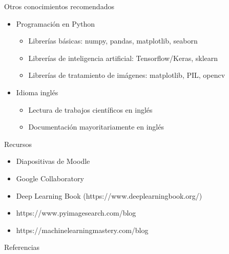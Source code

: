 \begin{frame}{Otros conocimientos recomendados}
\begin{itemize}
    \item \alert{Programación en Python}
    \begin{itemize}
        \item Librerías básicas: numpy, pandas, matplotlib, seaborn
        \item Librerías de inteligencia artificial: Tensorflow/Keras, sklearn
        \item Librerías de tratamiento de imágenes: matplotlib, PIL, opencv
    \end{itemize}
    \item \alert{Idioma inglés}
    \begin{itemize}
        \item Lectura de trabajos científicos en inglés
        \item Documentación mayoritariamente en inglés
    \end{itemize}
\end{itemize}
\end{frame}

\begin{frame}{Recursos}
\begin{itemize}
    \item Diapositivas de Moodle
    \item Google Collaboratory
    \item Deep Learning Book (https://www.deeplearningbook.org/)
    \item https://www.pyimagesearch.com/blog
    \item https://machinelearningmastery.com/blog
\end{itemize}
\end{frame}


\begin{frame}[allowframebreaks]{Referencias}
    
    
\end{frame}


